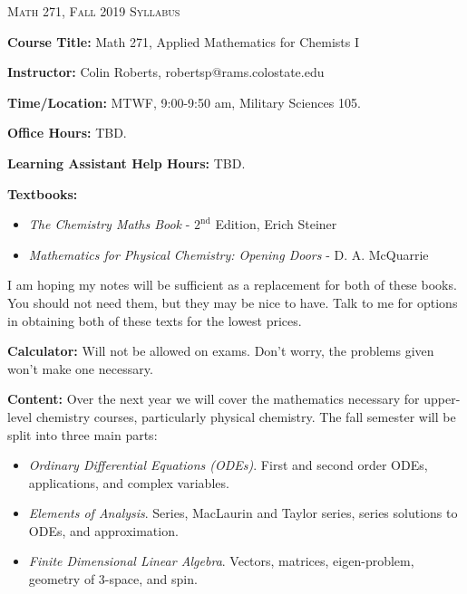 \documentclass[12pt]{amsbook}
\begin{document}

\SetWatermarkText{
\begin{minipage}[c][8cm]{8cm}
\begin{center}
 
\end{center}
\end{minipage}
}



\begin{center}
   \textsc{\large Math 271, Fall 2019 Syllabus}
\end{center}
\vspace{.5cm}

\textbf{Course Title:} Math 271, Applied Mathematics for Chemists I

\textbf{Instructor:} Colin Roberts, robertsp@rams.colostate.edu

\textbf{Time/Location:} MTWF, 9:00-9:50 am, Military Sciences 105.  

\textbf{Office Hours:} TBD.

\textbf{Learning Assistant Help Hours:} TBD.

\textbf{Textbooks:} \begin{itemize}
    \item \emph{The Chemistry Maths Book} - $2^{\text{nd}}$ Edition, Erich Steiner
    \item \emph{Mathematics for Physical Chemistry: Opening Doors} - D. A. McQuarrie
\end{itemize}
I am hoping my notes will be sufficient as a replacement for both of these books.  You should not need them, but they may be nice to have.  Talk to me for options in obtaining both of these texts for the lowest prices.

\textbf{Calculator:} Will not be allowed on exams.  Don't worry, the problems given won't make one necessary.

\textbf{Content:} Over the next year we will cover the mathematics necessary for upper-level chemistry courses, particularly physical chemistry. The fall semester will be split into three main parts:
\begin{itemize}
    \item \emph{Ordinary Differential Equations (ODEs)}. First and second order ODEs, applications, and complex variables.
    \item \emph{Elements of Analysis}. Series, MacLaurin and Taylor series, series solutions to ODEs, and approximation.
    \item \emph{Finite Dimensional Linear Algebra}. Vectors, matrices, eigen-problem, geometry of 3-space, and spin.
\end{itemize}
\end{document}
